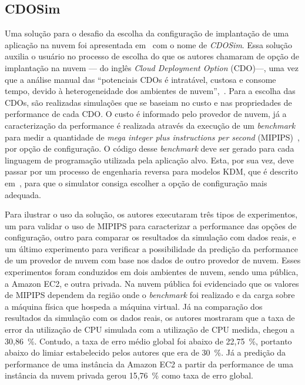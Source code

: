 \subsection{CDOSim}\label{subsec:CDOSim}
Uma solução para o desafio da escolha da configuração de implantação de uma aplicação na nuvem foi apresentada em~\cite{fittkau2012cdosim} com o nome de \textit{CDOSim}. Essa solução auxilia o usuário no processo de escolha do que os autores chamaram de opção de implantação na nuvem --- do inglês \textit{Cloud Deployment Option} (CDO)---, uma vez que a análise manual das ``potenciais CDOs é intratável, custosa e consome tempo, devido à heterogeneidade dos ambientes de nuvem'',~\cite{fittkau2012cdosim}. Para a escolha das CDOs, são realizadas simulações que se baseiam no custo e nas propriedades de performance de cada CDO. O custo é informado pelo provedor de nuvem, já a caracterização da performance é realizada através da execução de um \textit{benchmark} para medir a quantidade de \textit{mega integer plus instructions per second} (MIPIPS)~\cite{fittkau2012cdosim}, por opção de configuração. O código desse \textit{benchmark} deve ser gerado para cada linguagem de programação utilizada pela aplicação alvo. Esta, por sua vez, deve passar por um processo de engenharia reversa para modelos KDM, que é descrito em~\cite{perez2011knowledge}, para que o simulator consiga escolher a opção de configuração mais adequada.

Para ilustrar o uso da solução, os autores executaram três tipos de experimentos, um para validar o uso de MIPIPS para caracterizar a performance das opções de configuração, outro para comparar os resultados da simulação com dados reais, e um último experimento para verificar a possibilidade da predição da performance de um provedor de nuvem com base nos dados de outro provedor de nuvem. Esses experimentos foram conduzidos em dois ambientes de nuvem, sendo uma pública, a Amazon EC2, e outra privada. Na nuvem pública foi evidenciado que os valores de MIPIPS dependem da região onde o \textit{benchmark} foi realizado e da carga sobre a máquina física que hospeda a máquina virtual. Já na comparação dos resultados da simulação com os dados reais, os autores mostraram que a taxa de error da utilização de CPU simulada com a utilização de CPU medida, chegou a 30,86~\%. Contudo, a taxa de erro médio global foi abaixo de 22,75~\%, portanto abaixo do limiar estabelecido pelos autores que era de 30~\%. Já a predição da performance de uma instância da Amazon EC2 a partir da performance de uma instância da nuvem privada gerou 15,76~\% como taxa de erro global.

